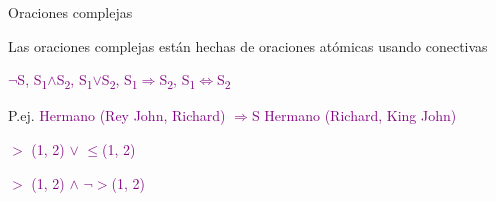 \begin{frame}{Oraciones complejas}
    
    Las oraciones complejas están hechas de oraciones atómicas usando conectivas
    
    {\selectfont
    \textcolor{purple}{$\neg$S, }}
    {\selectfont
    \textcolor{purple}{S\textsubscript{1}$\land$S\textsubscript{2}, }}
    {\selectfont
    \textcolor{purple}{S\textsubscript{1}$\lor$S\textsubscript{2}, }}
    {\selectfont
    \textcolor{purple}{S\textsubscript{1}$\Rightarrow$S\textsubscript{2}, }}
    {\selectfont
    \textcolor{purple}{S\textsubscript{1}$\Leftrightarrow$S\textsubscript{2}}}
    \bigskip
    
    {\selectfont
    P.ej. \textcolor{purple}{ Hermano (Rey John, Richard) $\Rightarrow$S Hermano (Richard, King John)}}
    \bigskip
    
    \quad \textcolor{purple}{$>$ (1, 2) $\lor$ $\leq$(1, 2)}
    
    \quad \textcolor{purple}{$>$ (1, 2) $\land$ $\neg$$>$(1, 2)}
    
\end{frame}